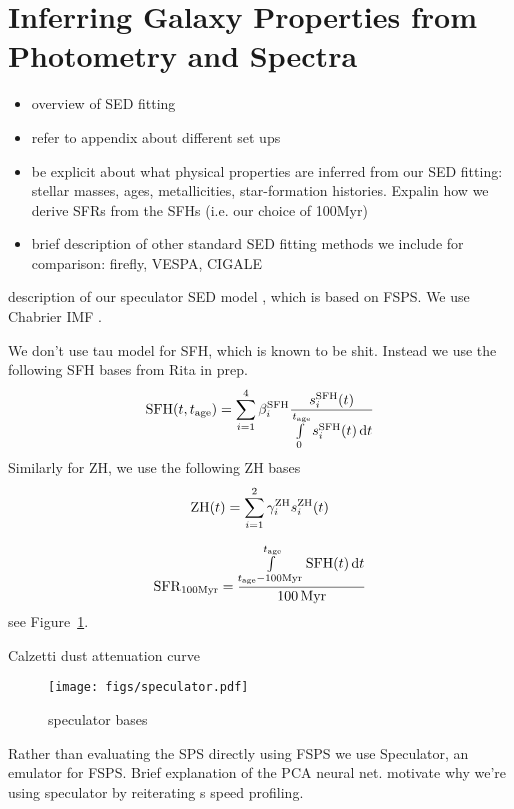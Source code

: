 \section{Inferring Galaxy Properties from Photometry and Spectra} \label{sec:methods}
\begin{itemize}
    \item overview of SED fitting
    \item refer to appendix about different set ups 
    \item be explicit about what physical properties are inferred from our SED
        fitting: stellar masses, ages, metallicities, star-formation histories.
        Expalin how we derive SFRs from the SFHs (i.e. our choice of 100Myr) 
    \item brief description of other standard SED fitting methods we include for
        comparison: firefly, VESPA, CIGALE
\end{itemize} 


description of our speculator SED model \citep{alsing2019}, which is based on
FSPS. We use Chabrier IMF . 

We don't use tau model for SFH, which is known to be shit. Instead we use the
following SFH bases from Rita in prep. 
\begin{equation}
    {\rm SFH}(t, t_{\rm age}) = \sum\limits_{i=1}^{4} \beta_i^{\rm SFH}
    \frac{s_i^{\rm SFH}(t)}{\int\limits_0^{t_{\rm age}} s_i^{\rm SFH}(t) \,
    {\rm d}t}
\end{equation} 
Similarly for ZH, we use the following ZH bases 
\begin{equation}
    {\rm ZH}(t) = \sum\limits_{i=1}^2 \gamma_i^{\rm ZH} s_i^{\rm ZH}(t)
\end{equation} 

\begin{equation}
    {\rm SFR}_{100{\rm Myr}} = \frac{\int\limits_{t_{\rm age} - 100{\rm
    Myr}}^{t_{\rm age}}{\rm SFH}(t)\,{\rm d}t}{100\,{\rm Myr}}
\end{equation} 
see Figure~\ref{fig:speculator}. 

Calzetti dust attenuation curve

\begin{figure}
\begin{center}
\texttt{[image: figs/speculator.pdf]} 
\caption{speculator bases}
\label{fig:speculator}
\end{center}
\end{figure}
Rather than evaluating the SPS directly using FSPS we use {\sc Speculator}, an
emulator for FSPS. Brief explanation of the PCA neural net. motivate why we're
using speculator by reiterating \cite{alsing2019}s speed profiling. 

